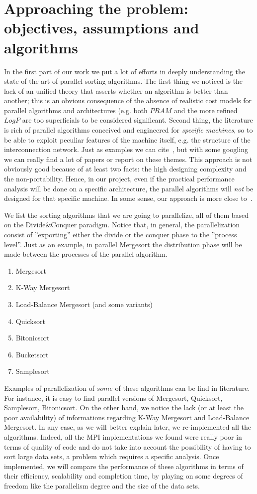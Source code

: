 \section{Approaching the problem: objectives, assumptions and algorithms}
In the first part of our work we put a lot of efforts in deeply understanding the state of the art of parallel sorting algorithms. The first thing we noticed is the lack of an unified theory that asserts whether an algorithm is better than another; this is an obvious consequence of the absence of realistic cost models for parallel algorithms and architectures (e.g. both $PRAM$ and the more refined $LogP$ are too superficials to be considered significant. Second thing, the literature is rich of parallel algorithms conceived and engineered for \textit{specific machines}, so to be able to exploit peculiar features of the machine itself, e.g. the structure of the interconnection network. Just as examples we can cite~\cite{CSPA, CSPA2}, but with some googling we can really find a lot of papers or report on these themes. This approach is not obviously good because of at least two facts: the high designing complexity and the non-portability. Hence, in our project, even if the practical performance analysis will be done on a specific architecture, the parallel algorithms will \textit{not} be designed for that specific machine. In some sense, our approach is more close to~\cite{NPSA}.

We list the sorting algorithms that we are going to parallelize, all of them based on the Divide$\&$Conquer paradigm. Notice that, in general, the parallelization consist of ''exporting'' either the divide or the conquer phase to the ''process level''. Just as an example, in parallel Mergesort the distribution phase will be made between the processes of the parallel algorithm. 
\begin{enumerate}
\item Mergesort
\item K-Way Mergesort
\item Load-Balance Mergesort (and some variants) 
\item Quicksort
\item Bitonicsort
\item Bucketsort
\item Samplesort
\end{enumerate}
Examples of parallelization of $some$ of these algorithms can be find in literature. For instance, it is easy to find parallel versions of Mergesort, Quicksort, Samplesort, Bitonicsort. On the other hand, we notice the lack (or at least the poor availability) of informations regarding K-Way Mergesort and Load-Balance Mergesort. In any case, as we will better explain later, we re-implemented all the algorithms. Indeed, all the MPI implementations we found were really poor in terms of quality of code and do not take into account the possibility of having to sort large data sets, a problem which requires a specific analysis. Once implemented, we will compare the performance of these algorithms in terms of their efficiency, scalability and completion time, by playing on some degrees of freedom like the parallelism degree and the size of the data sets.  
 
